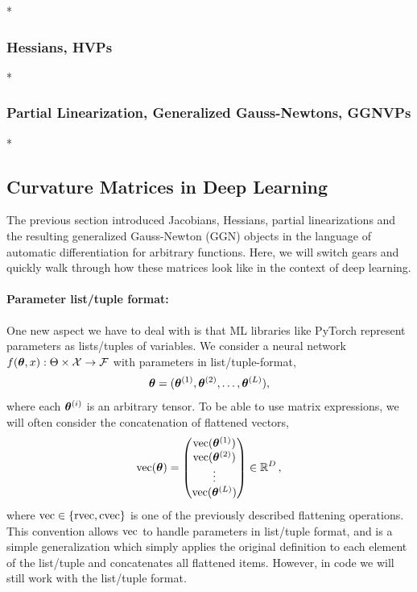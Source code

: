 \switchcolumn[0]*
\subsubsection{Hessians, HVPs}


\switchcolumn[0]*
\subsubsection{Partial Linearization, Generalized Gauss-Newtons, GGNVPs}\label{sec:partial_linearization}


\switchcolumn[0]*
\subsection{Curvature Matrices in Deep Learning}

The previous section introduced Jacobians, Hessians, partial linearizations and the resulting generalized Gauss-Newton (GGN) objects in the language of automatic differentiation for arbitrary functions.
Here, we will switch gears and quickly walk through how these matrices look like in the context of deep learning.

\paragraph{Parameter list/tuple format:} One new aspect we have to deal with is that ML libraries like PyTorch represent parameters as lists/tuples of variables.
We consider a neural network $f(\vtheta, x): \Theta \times \gX \to \gF$ with parameters in list/tuple-format,
\begin{align*}
  \vtheta = (\vtheta^{(1)}, \vtheta^{(2)}, \ldots, \vtheta^{(L)}),
\end{align*}
where each $\vtheta^{(i)}$ is an arbitrary tensor. To be able to use matrix expressions, we will often consider the concatenation of flattened vectors,
\begin{align*}
  \vec(\vtheta)
  =
  \begin{pmatrix}
    \vec(\vtheta^{(1)}) \\
    \vec(\vtheta^{(2)}) \\
    \vdots \\
    \vec(\vtheta^{(L)})
  \end{pmatrix}
  \in \sR^D
  \,,
\end{align*}
where $\vec \in \{ \rvec, \cvec \}$ is one of the previously described flattening operations.
This convention allows $\vec$ to handle parameters in list/tuple format, and is a simple generalization which simply applies the original definition to each element of the list/tuple and concatenates all flattened items.
However, in code we will still work with the list/tuple format.

